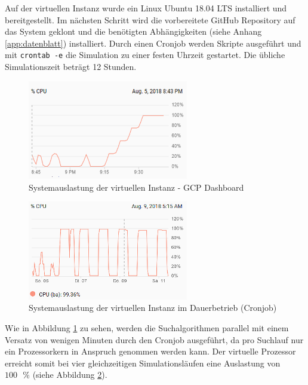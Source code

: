 	Auf der virtuellen Instanz wurde ein Linux Ubuntu 18.04 LTS installiert und bereitgestellt. Im nächsten Schritt wird die vorbereitete GitHub Repository auf das System geklont und die benötigten Abhängigkeiten (siehe Anhang \ref{app:datenblatt}) installiert. Durch einen Cronjob werden Skripte ausgeführt und mit \texttt{crontab -e} die Simulation zu einer festen Uhrzeit gestartet. Die übliche Simulationszeit beträgt 12 Stunden.\\
	\begin{minipage}[c]{0.5\textwidth}
		\begin{figure}[H] %
			\centering
			\includegraphics[width=7cm]{figures/chap_implement/GCP.png}
			\caption{Systemauslastung der virtuellen Instanz - GCP Dashboard}
			\label{fig:gcp_1}
		\end{figure}
	\end{minipage}
	\begin{minipage}[c]{0.5\textwidth}
		\begin{figure}[H] %
			\centering
			\includegraphics[width=7cm]{figures/chap_implement/GCP_2.png}
			\caption{Systemauslastung der virtuellen Instanz im Dauerbetrieb (Cronjob)}
			\label{fig:gcp_2}
		\end{figure}
	\end{minipage}\vspace{0.5cm}
	Wie in Abbildung \ref{fig:gcp_1} zu sehen, werden die Suchalgorithmen parallel mit einem Versatz von wenigen Minuten durch den Cronjob ausgeführt, da pro Suchlauf nur ein Prozessorkern in Anspruch genommen werden kann. Der virtuelle Prozessor erreicht somit bei vier gleichzeitigen Simulationsläufen eine Auslastung von $100\text{ }\%$ (siehe Abbildung \ref{fig:gcp_2}).
	

